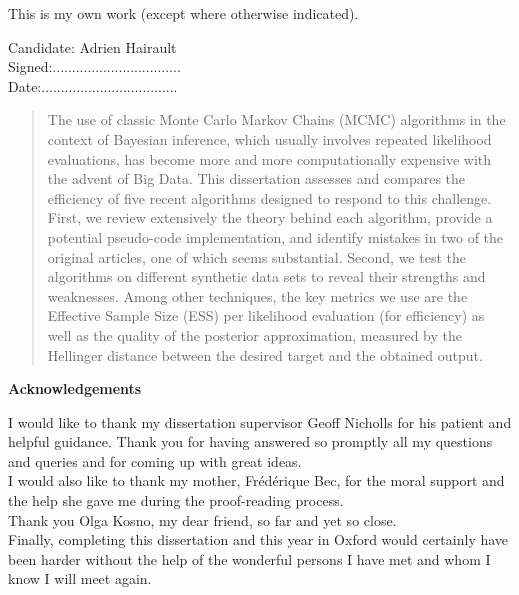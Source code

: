 \documentclass[11pt,a4paper]{report}\usepackage[]{graphicx}\usepackage[]{color}
\begin{document}
This is my own work (except where otherwise indicated).
\vspace{2.5in}

\begin{center}
Candidate: Adrien Hairault\\
\vspace{1.0in}
Signed:.................................\\
\vspace{1.0in}
Date:...................................
\end{center}
\clearpage
\begin{abstract}

The use of classic Monte Carlo Markov Chains (MCMC) algorithms in the context of Bayesian inference, which usually involves repeated likelihood evaluations, has become more and more computationally expensive with the advent of Big Data. This dissertation assesses and compares the efficiency of five recent algorithms designed to respond to this challenge. First, we review extensively the theory behind each algorithm, provide a potential pseudo-code implementation, and identify mistakes in two of the original articles, one of which seems substantial. Second, we test the algorithms on different synthetic data sets to reveal their strengths and weaknesses. Among other techniques, the key metrics we use are the Effective Sample Size (ESS) per likelihood evaluation (for efficiency) as well as the quality of the posterior approximation, measured by the Hellinger distance between the desired target and the obtained output.
\end{abstract}
\clearpage
\vspace*{2in}
\begin{center}
\textbf{Acknowledgements}
\end{center}

I would like to thank my dissertation supervisor Geoff Nicholls for his patient and helpful guidance. Thank you for having answered so promptly all my questions and queries and for coming up with great ideas.\\
I would also like to thank my mother, Fr\'ed\'erique Bec, for the moral support and the help she gave me during the proof-reading process.\\
Thank you Olga Kosno, my dear friend, so far and yet so close.\\
Finally, completing this dissertation and this year in Oxford would certainly have been harder without the help of the wonderful persons I have met and whom I know I will meet again.\\
\end{document}
